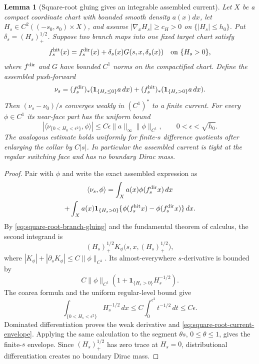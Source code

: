 \documentclass[11pt]{article}
\newtheorem{lemma}[theorem]{Lemma}
\newcommand{\one}{\mathbf 1}
\begin{document}
\begin{lemma}[Square-root gluing gives an integrable assembled current]
\label{lem:square-root-gluing-current}
Let $X$ be a compact coordinate chart with bounded smooth density $a(x)dx$,
let $H_s\in C^2((-s_0,s_0)\times X)$, and assume
$|\nabla_xH_s|\ge c_H>0$ on $\{|H_s|\le h_0\}$.  Put
$\delta_s=(H_s)_+^{1/2}$.  Suppose two branch maps into one fixed target
chart satisfy
\begin{equation}
\label{eq:square-root-branch-gluing}
 f_s^{\rm hit}(x)=f_s^{\rm dir}(x)
 +\delta_s(x)G(s,x,\delta_s(x))
 \quad\text{on }\{H_s>0\},
\end{equation}
where $f^{\rm dir}$ and $G$ have bounded $C^1$ norms on the compactified
chart.  Define the assembled push-forward
\[
 \nu_s=(f_s^{\rm dir})_*(\one_{\{H_s\le0\}}a\,dx)
       +(f_s^{\rm hit})_*(\one_{\{H_s>0\}}a\,dx).
\]
Then $(\nu_s-\nu_0)/s$ converges weakly in $(C^1)^*$ to a finite current.
For every $\phi\in C^1$ its near-face part has the uniform bound
\begin{equation}
\label{eq:square-root-current-envelope}
 \left|\langle\dot\nu_{\{0<H_0<\epsilon^2\}},\phi\rangle\right|
 \le C\epsilon\|a\|_\infty\|\phi\|_{C^1},
 \qquad 0<\epsilon<\sqrt{h_0}.
\end{equation}
The analogous estimate holds uniformly for finite-$s$ difference quotients
after enlarging the collar by $C|s|$.  In particular the assembled current
is tight at the regular switching face and has no boundary Dirac mass.
\end{lemma}

\begin{proof}
Pair with $\phi$ and write the exact assembled expression as
\begin{multline*}
 \langle\nu_s,\phi\rangle
 =\int_Xa(x)\phi(f_s^{\rm dir}x)\,dx\\
 +\int_Xa(x)\one_{\{H_s>0\}}
 \{\phi(f_s^{\rm hit}x)-\phi(f_s^{\rm dir}x)\}\,dx.
\end{multline*}
By \eqref{eq:square-root-branch-gluing} and the fundamental theorem of
calculus, the second integrand is
\[
 (H_s)_+^{1/2}K_\phi\bigl(s,x,(H_s)_+^{1/2}\bigr),
\]
where
$|K_\phi|+|\partial_sK_\phi|\le C\|\phi\|_{C^1}$.  Its almost-everywhere
$s$-derivative is bounded by
\[
 C\|\phi\|_{C^1}
 \left(1+\one_{\{H_s>0\}}H_s^{-1/2}\right).
\]
The coarea formula and the uniform regular-level bound give
\[
 \int_{\{0<H_s<\epsilon^2\}}H_s^{-1/2}\,dx
 \le C\int_0^{\epsilon^2}t^{-1/2}\,dt\le C\epsilon.
\]
Dominated differentiation proves the weak derivative and
\eqref{eq:square-root-current-envelope}.  Applying the same calculation to
the segment $\theta s$, $0\le\theta\le1$, gives the finite-$s$ envelope.
Since $(H_s)_+^{1/2}$ has zero trace at $H_s=0$, distributional
differentiation creates no boundary Dirac mass.
\end{proof}
\end{document}
